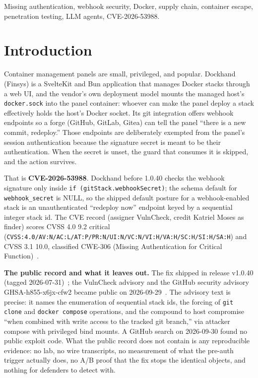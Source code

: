 \documentclass[journal]{IEEEtran}
\begin{document}
\begin{IEEEkeywords}
Missing authentication, webhook security, Docker, supply chain, container
escape, penetration testing, LLM agents, CVE-2026-53988.
\end{IEEEkeywords}

\section{Introduction}
\label{sec:intro}

Container management panels are small, privileged, and popular. Dockhand
(Finsys) is a SvelteKit and Bun application that manages Docker stacks through
a web UI, and the vendor's own deployment model mounts the managed host's
\texttt{docker.sock} into the panel container: whoever can make the panel
deploy a stack effectively holds the host's Docker socket. Its git integration
offers webhook endpoints so a forge (GitHub, GitLab, Gitea) can tell the panel
``there is a new commit, redeploy.'' Those endpoints are deliberately exempted
from the panel's session authentication because the signature secret is meant
to be their authentication. When the secret is unset, the guard that consumes
it is skipped, and the action survives.

That is \textbf{CVE-2026-53988}. Dockhand before 1.0.40 checks the webhook
signature only inside \texttt{if (gitStack.webhookSecret)}; the schema default
for \texttt{webhook\_secret} is NULL, so the shipped default posture for a
webhook-enabled stack is an unauthenticated ``redeploy now'' endpoint keyed by
a sequential integer stack id. The CVE record (assigner VulnCheck, credit
Katriel Moses as finder) scores CVSS 4.0 9.2 critical
(\texttt{CVSS:4.0/}\hspace{0pt}\texttt{AV:N/AC:L/AT:P/PR:N/}\hspace{0pt}\texttt{UI:N/VC:N/VI:H/VA:H/}\hspace{0pt}\texttt{SC:H/SI:H/SA:H})
and CVSS 3.1 10.0, classified CWE-306 (Missing Authentication for Critical
Function)~\cite{cverecord}.

\textbf{The public record and what it leaves out.} The fix shipped in release
v1.0.40 (tagged 2026-07-31)~\cite{vendorfix}; the VulnCheck advisory and the
GitHub security advisory GHSA-h855-x6jx-cfw2 became public on
2026-09-29~\cite{vulncheck,ghsa}. The advisory text is precise: it names the
enumeration of sequential stack ids, the forcing of \texttt{git clone} and
\texttt{docker compose} operations, and the compound to host compromise
``when combined with write access to the tracked git branch,'' via attacker
compose with privileged bind mounts. A GitHub search on 2026-09-30 found no
public exploit code. What the public record does not contain is any
reproducible evidence: no lab, no wire transcripts, no measurement of what the
pre-auth trigger actually does, no A/B proof that the fix stops the identical
objects, and nothing for defenders to detect with.
\end{document}
